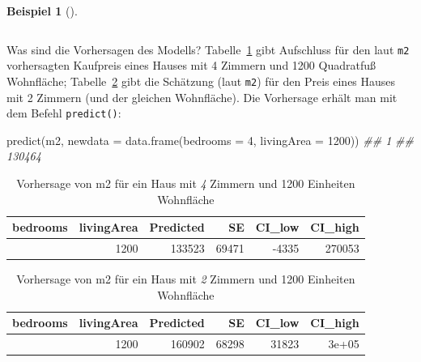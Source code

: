 \documentclass[
  ngerman,
  letterpaper,
  twoside,
  open=any]{scrbook}
\newenvironment{Shaded}{\begin{snugshade}}{\end{snugshade}}
\newcommand{\AttributeTok}[1]{\textcolor[rgb]{0.40,0.45,0.13}{#1}}
\newcommand{\DecValTok}[1]{\textcolor[rgb]{0.68,0.00,0.00}{#1}}
\newcommand{\DocumentationTok}[1]{\textcolor[rgb]{0.37,0.37,0.37}{\textit{#1}}}
\newcommand{\FunctionTok}[1]{\textcolor[rgb]{0.28,0.35,0.67}{#1}}
\newcommand{\NormalTok}[1]{\textcolor[rgb]{0.00,0.23,0.31}{#1}}
\theoremstyle{definition}
\newtheorem{example}{Beispiel}[chapter]
\theoremstyle{plain}
\theoremstyle{definition}
\theoremstyle{definition}
\theoremstyle{remark}
\begin{document}
\begin{example}[]
\begin{longtable}[]{@{}lr@{}}
\end{longtable}

Was sind die Vorhersagen des Modells? Tabelle~\ref{tbl-m2-pred} gibt
Aufschluss für den laut \texttt{m2} vorhersagten Kaufpreis eines Hauses
mit 4 Zimmern und 1200 Quadratfuß Wohnfläche; Tabelle~\ref{tbl-m2-pred2}
gibt die Schätzung (laut \texttt{m2}) für den Preis eines Hauses mit 2
Zimmern (und der gleichen Wohnfläche). Die Vorhersage erhält man mit dem
Befehl \texttt{predict()}:

\begin{Shaded}
\begin{Highlighting}[]
\FunctionTok{predict}\NormalTok{(m2, }\AttributeTok{newdata =} \FunctionTok{data.frame}\NormalTok{(}\AttributeTok{bedrooms =} \DecValTok{4}\NormalTok{, }\AttributeTok{livingArea =} \DecValTok{1200}\NormalTok{))}
\DocumentationTok{\#\#      1 }
\DocumentationTok{\#\# 130464}
\end{Highlighting}
\end{Shaded}

{

\begin{longtable}[]{@{}rrrrrr@{}}

\caption{\label{tbl-m2-pred}Vorhersage von m2 für ein Haus mit \emph{4}
Zimmern und 1200 Einheiten Wohnfläche}

\tabularnewline

\toprule\noalign{}
bedrooms & livingArea & Predicted & SE & CI\_low & CI\_high \\
\midrule\noalign{}
\endhead
\bottomrule\noalign{}
\endlastfoot
4 & 1200 & 133523 & 69471 & -4335 & 270053 \\

\end{longtable}

}

{

\begin{longtable}[]{@{}rrrrrr@{}}

\caption{\label{tbl-m2-pred2}Vorhersage von m2 für ein Haus mit \emph{2}
Zimmern und 1200 Einheiten Wohnfläche}

\tabularnewline

\toprule\noalign{}
bedrooms & livingArea & Predicted & SE & CI\_low & CI\_high \\
\midrule\noalign{}
\endhead
\bottomrule\noalign{}
\endlastfoot
2 & 1200 & 160902 & 68298 & 31823 & 3e+05 \\

\end{longtable}

}
\end{example}
\end{document}

